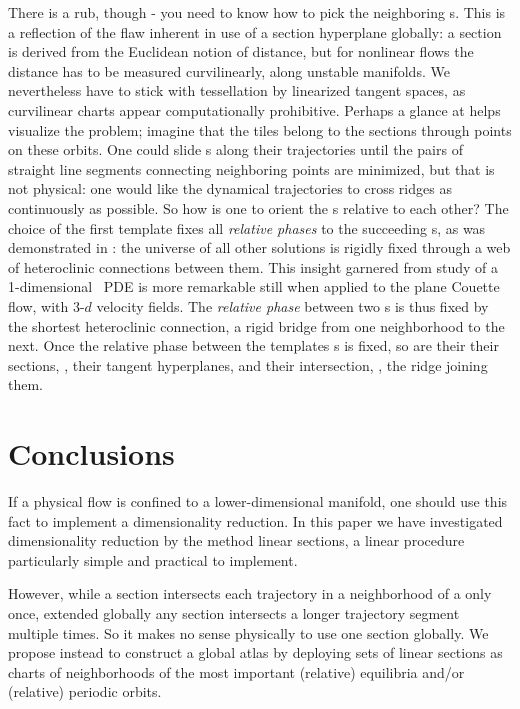 There is a rub, though - you need to know how to pick the
neighboring {\template s}. This is a reflection of the flaw inherent in use
of a \Poincare section hyperplane globally: a \Poincare section is derived from the Euclidean
notion of distance, but for nonlinear flows the distance has to be
measured curvilinearly, along unstable
manifolds. We nevertheless have to stick with
tessellation by linearized tangent spaces, as curvilinear charts appear
computationally prohibitive. Perhaps a glance at
 helps visualize the problem; imagine that the
tiles belong to the
\Poincare sections through {\template} points on these orbits. One could slide
{\template s} along their trajectories until the pairs of straight line
segments connecting neighboring {\template} points are minimized, but
that is not physical: one would like the dynamical trajectories to cross
ridges as continuously as possible. So how is one to orient
the {\template s} relative to each other? The choice of the first template fixes all {\em
relative phases} to the succeeding {\template s}, as was demonstrated in
: the universe of all other solutions is rigidly fixed
through a web of heteroclinic connections between them. This insight
garnered from study of a 1-dimensional \KS\ PDE is more remarkable still
when applied to the plane Couette flow, with 3-$d$ velocity
fields. The {\em relative phase} between
two {\template s} is thus fixed  by the shortest heteroclinic connection,
a rigid bridge from one neighborhood to the next. Once the relative phase
between the templates {\template s} is fixed, so are their their \Poincare sections,
\ie, their tangent hyperplanes, and their intersection, \ie, the  ridge
joining them.


\section{Conclusions}
    \label{sec:concl}

If a physical flow is confined to a lower-dimensional manifold, one should
use this fact to implement a dimensionality reduction.  In this
paper we have investigated dimensionality reduction by the method
linear \Poincare sections, a linear
procedure particularly simple and practical to implement.

 However, while a \Poincare section intersects each trajectory
  in a neighborhood of a {\template} only once, extended globally any
\Poincare section intersects a longer trajectory segment multiple times. So
it makes no sense physically to use one
\Poincare section globally. We propose instead to construct a global atlas by
deploying sets of linear \Poincare sections as charts of
neighborhoods of the most important (relative) equilibria and/or
(relative) periodic orbits.

